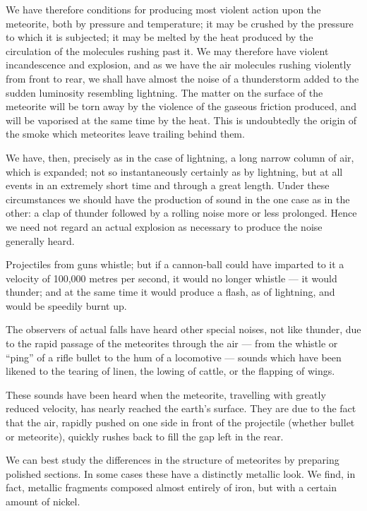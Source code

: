 \documentclass[a4paper, 12pt, oneside, polutonikogreek, english]{article}
\begin{document}
We have therefore conditions for producing most violent action upon the meteorite, both by pressure and temperature; it may be crushed by the pressure to which it is subjected; it may be melted by the heat produced by the circulation of the molecules rushing past it. We may therefore have violent incandescence and explosion, and as we have the air molecules rushing violently from front to rear, we shall have almost the noise of a thunderstorm added to the sudden luminosity resembling lightning. The matter on the surface of the meteorite will be torn away by the violence of the gaseous friction produced, and will be vaporised at the same time by the heat. This is undoubtedly the origin of the smoke which meteorites leave trailing behind them.

We have, then, precisely as in the case of lightning, a long narrow column of air, which is expanded; not so instantaneously certainly as by lightning, but at all events in an extremely short time and through a great length. Under these circumstances we should have the production of sound in the one case as in the other: a clap of thunder followed by a rolling noise more or less prolonged. Hence we need not regard an actual explosion as necessary to produce the noise generally heard.

Projectiles from guns whistle; but if a cannon-ball could have imparted to it a velocity of 100,000 metres per second, it would no longer whistle --- it would thunder; and at the same time it would produce a flash, as of lightning, and would be speedily burnt up.

The observers of actual falls have heard other special noises, not like thunder, due to the rapid passage of the meteorites through the air --- from the whistle or ``ping'' of a rifle bullet to the hum of a locomotive --- sounds which have been likened to the tearing of linen, the lowing of cattle, or the flapping of wings.

These sounds have been heard when the meteorite, travelling with greatly reduced velocity, has nearly reached the earth's surface. They are due to the fact that the air, rapidly pushed on one side in front of the projectile (whether bullet or meteorite), quickly rushes back to fill the gap left in the rear.

We can best study the differences in the structure of meteorites by preparing polished sections. In some cases these have a distinctly metallic look. We find, in fact, metallic fragments composed almost entirely of iron, but with a certain amount of nickel.
\end{document}
